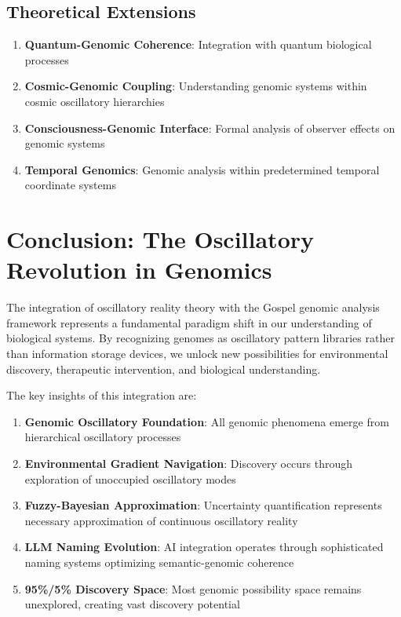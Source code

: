 \documentclass[12pt,a4paper]{article}
\begin{document}
\subsection{Theoretical Extensions}

\begin{enumerate}
\item \textbf{Quantum-Genomic Coherence}: Integration with quantum biological processes
\item \textbf{Cosmic-Genomic Coupling}: Understanding genomic systems within cosmic oscillatory hierarchies
\item \textbf{Consciousness-Genomic Interface}: Formal analysis of observer effects on genomic systems
\item \textbf{Temporal Genomics}: Genomic analysis within predetermined temporal coordinate systems
\end{enumerate}

\section{Conclusion: The Oscillatory Revolution in Genomics}

The integration of oscillatory reality theory with the Gospel genomic analysis framework represents a fundamental paradigm shift in our understanding of biological systems. By recognizing genomes as oscillatory pattern libraries rather than information storage devices, we unlock new possibilities for environmental discovery, therapeutic intervention, and biological understanding.

The key insights of this integration are:

\begin{enumerate}
\item \textbf{Genomic Oscillatory Foundation}: All genomic phenomena emerge from hierarchical oscillatory processes
\item \textbf{Environmental Gradient Navigation}: Discovery occurs through exploration of unoccupied oscillatory modes  
\item \textbf{Fuzzy-Bayesian Approximation}: Uncertainty quantification represents necessary approximation of continuous oscillatory reality
\item \textbf{LLM Naming Evolution}: AI integration operates through sophisticated naming systems optimizing semantic-genomic coherence
\item \textbf{95\%/5\% Discovery Space}: Most genomic possibility space remains unexplored, creating vast discovery potential
\end{enumerate}
\end{document}
